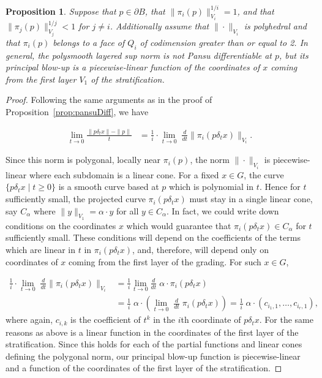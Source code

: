 \documentclass[10pt,a4paper]{amsart}
\newtheorem{prop}{Proposition}
\newcommand{\ddt}{\frac{d}{dt}}
\newcommand{\norm}[1]{\|#1\|}
\begin{document}
\begin{prop}\label{prop:edges} Suppose that $p \in \partial B$, that $\norm{\pi_i(p)}_{V_i}^{1/i} = 1$, and that $\norm{\pi_j(p)}_{V_j}^{1/j} < 1$ for $j\neq i$. Additionally assume that $\norm{\cdot}_{V_i}$ is polyhedral and that $\pi_i(p)$ belongs to a face of $Q_i$ of codimension greater than or equal to 2. In general, the polysmooth layered sup norm
is not Pansu differentiable at $p$, but its principal blow-up is a piecewise-linear function of the coordinates of $x$ coming from the first layer $V_1$ of the stratification.
\end{prop}

\begin{proof}
Following the same arguments as in the proof of Proposition~\ref{prop:pansuDiff}, we have

\begin{align*}
\lim_{t\to 0}\frac{\norm{p\delta_t x} - \norm{p}}{t}
&= \frac{1}{i}\cdot \lim_{t\to0} \;\ddt \norm{\pi_i(p\delta_t x)}_{V_i}.
\end{align*}

Since this norm is polygonal, locally near $\pi_i(p)$, the norm $\norm{\cdot}_{V_i}$ is piecewise-linear where each subdomain is a linear cone.
For a fixed $x \in G$, the curve $\{p\delta_tx\mid t\geq0\}$ is a smooth curve based at $p$ which is polynomial in $t$. Hence for $t$ sufficiently small, the projected curve $\pi_i(p\delta_t x)$ must stay in a single linear cone, say $C_\alpha$ where $\norm{y}_{V_1} = \alpha \cdot y$ for all $y \in C_\alpha$. In fact, we could write down conditions on the coordinates $x$ which would guarantee that $\pi_i(p\delta_tx) \in C_\alpha$ for $t$ sufficiently small. These conditions will depend on the coefficients of the terms which are linear in $t$ in $\pi_i(p\delta_tx)$, and, therefore, will depend only on coordinates of $x$ coming from the first layer of the grading. For such $x \in G$, 

\begin{align*}
\frac{1}{i}\cdot \lim_{t\to0} \;\ddt \norm{\pi_i(p\delta_t x)}_{V_i} &= \frac1i \lim_{t\to 0}\ddt\; \alpha \cdot \pi_i(p\delta_tx)\\
& = \frac1i \;\alpha\cdot \left(\lim_{t\to 0}\;\ddt\; \pi_i(p\delta_tx)\right) = \frac1i \; \alpha \cdot (c_{i_1,1}, \ldots, c_{i_r,1}),
\end{align*}
where again, $c_{i,k}$ is the coefficient of $t^k$ in the $i$th coordinate of $p\delta_t x$. For the same reasons as above is a linear function in the coordinates of the first layer of the stratification. Since this holds for each of the partial functions and linear cones defining the polygonal norm, our principal blow-up function is piecewise-linear and a function of the coordinates of the first layer of the stratification.

\end{proof}
\end{document}
